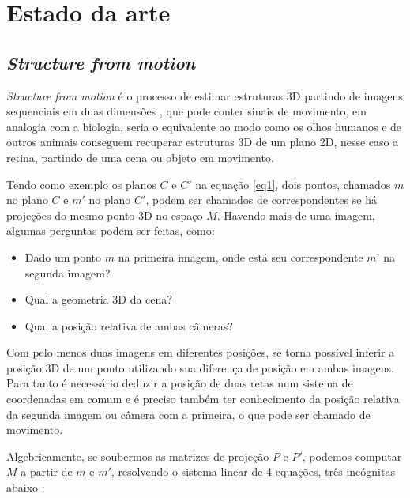 
\chapter{Estado da arte}

\section{\textit{Structure from motion}}

\textit{Structure from motion} é o processo de estimar estruturas 3D partindo de imagens sequenciais em duas dimensões \cite{SFM}, que pode conter sinais de movimento, em analogia com a biologia, seria o equivalente ao modo  como os olhos humanos e de outros animais conseguem recuperar estruturas 3D de um plano 2D, nesse caso a retina, partindo de uma cena ou objeto em movimento.

Tendo como exemplo os planos $C$ e $C'$ na equação \eqref{eq1}, dois pontos, chamados $m$ no plano $C$ e $m'$ no plano $C'$, podem ser chamados de correspondentes se há projeções do mesmo ponto 3D no espaço $M$. Havendo mais de uma imagem, algumas perguntas podem ser feitas, como:

\begin{itemize}
	\item{Dado um ponto $m$ na primeira imagem, onde está seu correspondente $m’$ na segunda imagem?}
	\item{Qual a geometria 3D da cena?}
	\item{Qual a posição relativa de ambas câmeras?}
\end{itemize}
	
Com pelo menos duas imagens em diferentes posições, se torna possível inferir a posição 3D de um ponto utilizando sua diferença de posição em ambas imagens. Para tanto é necessário deduzir a posição de duas retas num sistema de coordenadas em comum e é preciso também ter conhecimento da posição relativa da segunda imagem ou câmera com a primeira, o que pode ser chamado de movimento.

Algebricamente, se soubermos as matrizes de projeção $P$ e $P'$, podemos computar $M$ a partir de $m$ e $m'$, resolvendo o sistema linear de 4 equações, três incógnitas abaixo \cite{Faugeras-Geometry}:


